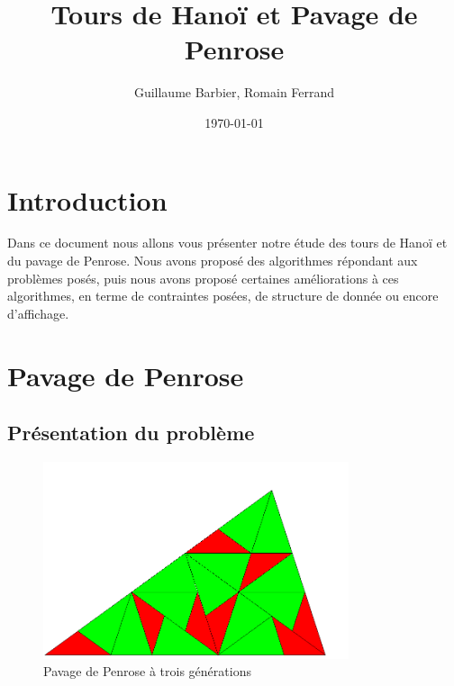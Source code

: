 \documentclass[a4paper,11pt]{article}
\begin{document}
\begin{titlepage}
  \title{Tours de Hanoï et Pavage de Penrose}
  \author{Guillaume Barbier, Romain Ferrand}
  \date{\today}

  \maketitle

  \begin{abstract}
    
  \end{abstract}
\end{titlepage}

\section*{Introduction}
  Dans ce document nous allons vous présenter notre étude des tours de Hanoï et du
  pavage de Penrose. Nous avons proposé des algorithmes répondant aux problèmes posés, puis
  nous avons proposé certaines améliorations à ces algorithmes, en terme de contraintes posées,
  de structure de donnée ou encore d'affichage.

\section{Pavage de Penrose}
\label{chap:penrose}



\subsection{Présentation du problème}
\label{sec:prezPenrose}
\begin{figure}
  \centering
  \includegraphics[width=0.8\textwidth]{penrose_example.png}
  \caption{Pavage de Penrose à trois générations}
  \label{fig:penrose_example}
\end{figure}
\end{document}
